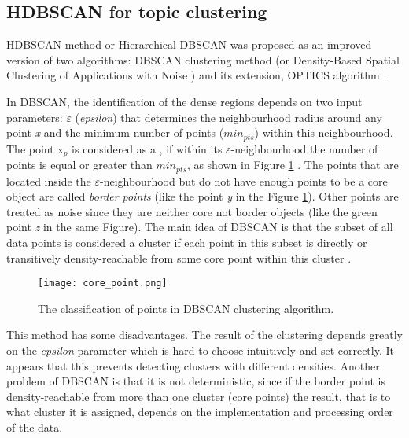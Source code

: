 \documentclass[fontsize=12pt,a4paper,twoside,openany]{scrbook}
\begin{document}
\subsection{HDBSCAN for topic clustering}
\label{sec:HDBSCAN}

HDBSCAN method or Hierarchical-DBSCAN \parencite{Campello13, Campello15} was proposed as an improved version of two algorithms: DBSCAN clustering method (or Density-Based Spatial Clustering of Applications with Noise \parencite{Ester96}) and its extension, OPTICS algorithm \parencite{Ankerst99}.

In DBSCAN, the identification of the dense regions depends on two input parameters:  \(\varepsilon\) (\emph{epsilon}) that determines the neighbourhood radius around any point \emph{x} and the minimum number of points (\(min_{pts}\)) within this neighbourhood. The point x\(_p\) is considered as a  \parencite{Campello13}, if within its \(\varepsilon\)-neighbourhood the number of points is equal or greater than \(min_{pts}\), as shown in Figure \ref{fig:core_point} . The points that are located inside the \(\varepsilon\)-neighbourhood but do not have enough points to be a core object are called \emph{border points} (like the point \emph{y} in the Figure \ref{fig:core_point}). Other points are treated as noise since they are neither core not border objects (like the green point \emph{z} in the same Figure). The main idea of DBSCAN is that the subset of all data points is considered a cluster if each point in this subset is directly or transitively density-reachable from some core point within this cluster \parencite{Ester96}.

\begin{figure}[h]
\centering
\texttt{[image: core\_point.png]}
\caption{The classification of points in DBSCAN clustering algorithm.}
\label{fig:core_point}
\end{figure}

This method has some disadvantages. The result of the clustering depends greatly on the \emph{epsilon} parameter which is hard to choose intuitively and set correctly. It appears that this  \parencite{Malzer20} prevents detecting clusters with different densities. Another problem of DBSCAN is that it is not deterministic, since if the border point is density-reachable from more than one cluster (core points) the result, that is to what cluster it is assigned, depends on the implementation and processing order of the data. 
\end{document}
